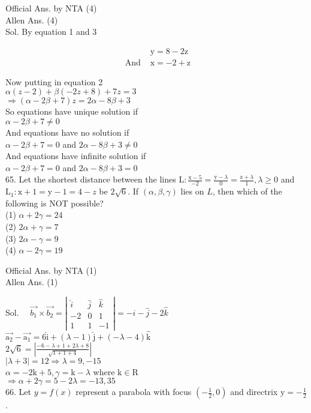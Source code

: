\documentclass[10pt]{article}
\begin{document}
Official Ans. by NTA (4)\\
Allen Ans. (4)\\
Sol. By equation 1 and 3

\[
\begin{array}{ll} 
& \mathrm{y}=8-2 \mathrm{z} \\
\text { And } & \mathrm{x}=-2+\mathrm{z}
\end{array}
\]

Now putting in equation 2\\
\(\alpha(z-2)+\beta(-2 z+8)+7 z=3\)\\
\(\Rightarrow(\alpha-2 \beta+7) z=2 \alpha-8 \beta+3\)\\
So equations have unique solution if\\
\(\alpha-2 \beta+7 \neq 0\)\\
And equations have no solution if\\
\(\alpha-2 \beta+7=0\) and \(2 \alpha-8 \beta+3 \neq 0\)\\
And equations have infinite solution if\\
\(\alpha-2 \beta+7=0\) and \(2 \alpha-8 \beta+3=0\)\\
65. Let the shortest distance between the lines \(\mathrm{L}: \frac{\mathrm{x}-5}{-2}=\frac{\mathrm{y}-\lambda}{0}=\frac{\mathrm{z}+\lambda}{1}, \lambda \geq 0\) and \(\mathrm{L}_{1}: \mathrm{x}+1=\mathrm{y}- 1=4-z\) be \(2 \sqrt{6}\). If \((\alpha, \beta, \gamma)\) lies on \(L\), then which of the following is NOT possible?\\
(1) \(\alpha+2 \gamma=24\)\\
(2) \(2 \alpha+\gamma=7\)\\
(3) \(2 \alpha-\gamma=9\)\\
(4) \(\alpha-2 \gamma=19\)

Official Ans. by NTA (1)\\
Allen Ans. (1)

Sol. \(\quad \overrightarrow{b_{1}} \times \overrightarrow{b_{2}}=\left|\begin{array}{ccc}\hat{i} & \hat{j} & \hat{k} \\ -2 & 0 & 1 \\ 1 & 1 & -1\end{array}\right|=-\hat{i}-\hat{j}-2 \hat{k}\)\\
\(\overrightarrow{\mathrm{a}_{2}}-\overrightarrow{\mathrm{a}_{1}}=6 \hat{\mathrm{i}}+(\lambda-1) \hat{\mathrm{j}}+(-\lambda-4) \hat{\mathrm{k}}\)\\
\(2 \sqrt{6}=\left|\frac{-6-\lambda+1+2 \lambda+8}{\sqrt{1+1+4}}\right|\)\\
\(|\lambda+3|=12 \Rightarrow \lambda=9,-15\)\\
\(\alpha=-2 \mathrm{k}+5, \gamma=\mathrm{k}-\lambda\) where \(\mathrm{k} \in \mathrm{R}\)\\
\(\Rightarrow \alpha+2 \gamma=5-2 \lambda=-13,35\)\\
66. Let \(y=f(x)\) represent a parabola with focus \(\left(-\frac{1}{2}, 0\right)\) and directrix \(\mathrm{y}=-\frac{1}{2}\).
\end{document}
